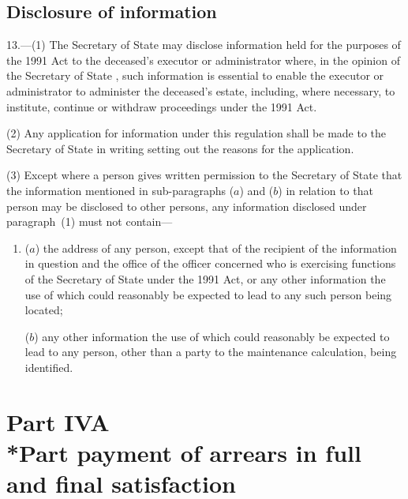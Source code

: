 \documentclass[12pt,a4paper]{article}
\begin{document}
\subsection[13. Disclosure of information]{Disclosure of information}

13.---(1)  The 
Secretary of State  %
may disclose information held for the purposes of the 1991 Act to the deceased’s executor or administrator where, in the opinion of the 
Secretary of State%
, such information is essential to enable the executor or administrator to administer the deceased’s estate, including, where necessary, to institute, continue or withdraw proceedings under the 1991 Act.

(2) Any application for information under this regulation shall be made to the 
Secretary of State  %
in writing setting out the reasons for the application.

(3) Except where a person gives written permission to the 
Secretary of State  %
that the information mentioned in sub-paragraphs ($a$)  and ($b$)  in relation to that person may be disclosed to other persons, any information disclosed under paragraph~(1) must not contain—
\begin{enumerate}\item[]
($a$) the address of any person, except that of the recipient of the information in question and the office of the officer concerned who is exercising functions of the 
Secretary of State  %
under the 1991 Act, or any other information the use of which could reasonably be expected to lead to any such person being located;

($b$) any other information the use of which could reasonably be expected to lead to any person, other than a party to the maintenance calculation, being identified.
\end{enumerate}


\section[Part IVA --- Part payment of arrears in full and final satisfaction]{Part IVA\\*Part payment of arrears in full and final satisfaction}
\end{document}
